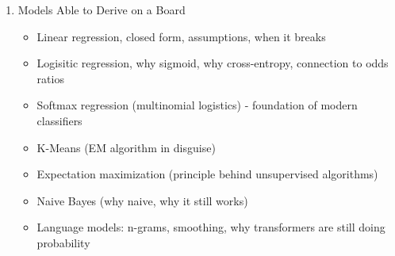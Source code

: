 \documentclass{article}
\begin{document}
\begin{enumerate}
    \item Models Able to Derive on a Board
        \begin{itemize}
            \item Linear regression, closed form, assumptions, when it breaks
            \item Logisitic regression, why sigmoid, why cross-entropy, connection to odds ratios
            \item Softmax regression (multinomial logistics) - foundation of modern classifiers
            \item K-Means (EM algorithm in disguise)
            \item Expectation maximization (principle behind unsupervised algorithms)
            \item Naive Bayes (why naive, why it still works)
            \item Language models: n-grams, smoothing, why transformers are still doing probability
        \end{itemize}


\end{enumerate}
\end{document}
